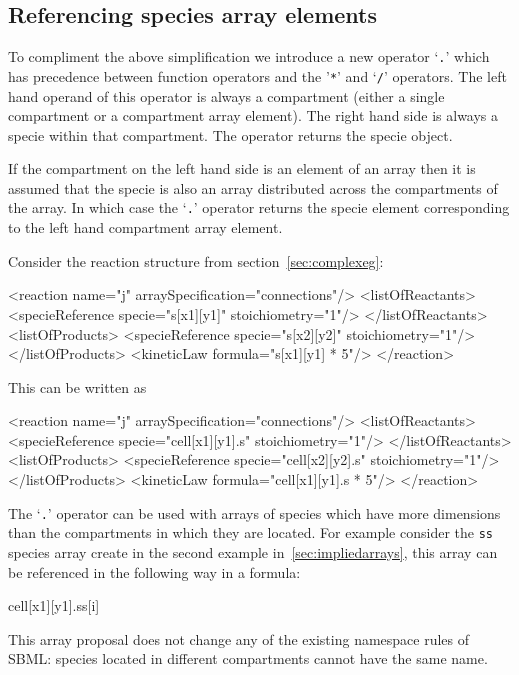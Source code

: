 \documentclass{cekarticle}
\begin{document}
\subsection{Referencing species array elements}

To compliment the above simplification we introduce a new
operator `\texttt{.}' which has precedence between function
operators and the '\texttt{*}' and `\texttt{/}' operators. The left
hand operand of this operator is always a compartment (either a
single compartment or a compartment array element).  The right
hand side is always a specie within that compartment.  The
operator returns the specie object.

If the compartment on the left hand side is an element of an
array then it is assumed that the specie is also an array
distributed across the compartments of the array. In which case
the `\texttt{.}' operator returns the specie element
corresponding to the left hand compartment array element.

Consider the reaction structure from section~\ref{sec:complexeg}:

\begin{example}
<reaction name="j" arraySpecification="connections"/>
    <listOfReactants>
        <specieReference specie="s[x1][y1]" stoichiometry="1"/>
    </listOfReactants>
    <listOfProducts>
        <specieReference specie="s[x2][y2]" stoichiometry="1"/>
    </listOfProducts>
    <kineticLaw formula="s[x1][y1] * 5"/>
</reaction>
\end{example}
This can be written as
\begin{example}
<reaction name="j" arraySpecification="connections"/>
    <listOfReactants>
        <specieReference specie="cell[x1][y1].s" stoichiometry="1"/>
    </listOfReactants>
    <listOfProducts>
        <specieReference specie="cell[x2][y2].s" stoichiometry="1"/>
    </listOfProducts>
    <kineticLaw formula="cell[x1][y1].s * 5"/>
</reaction>
\end{example}

The `\texttt{.}' operator can be used with arrays of species which
have more dimensions than the compartments in which they are
located. For example consider the \texttt{ss} species array
create in the second example in~\ref{sec:impliedarrays}, this array
can be referenced in the following way in a formula:
\begin{example}
cell[x1][y1].ss[i]
\end{example}

This array proposal does not change any of the existing namespace
rules of SBML: species located in different compartments cannot
have the same name.
\end{document}
